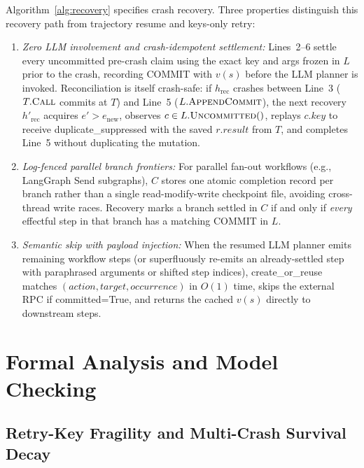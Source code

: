 \documentclass[10pt,journal]{IEEEtran}
\def\texttt#1{#1}%
\theoremstyle{definition}
\theoremstyle{remark}
\begin{document}
Algorithm~\ref{alg:recovery} specifies crash recovery. Three properties distinguish this recovery path from trajectory resume and keys-only retry:
\begin{enumerate}
  \item \emph{Zero LLM involvement and crash-idempotent settlement:} Lines~2--6 settle every uncommitted pre-crash claim using the exact \texttt{key} and \texttt{args} frozen in $L$ prior to the crash, recording \texttt{COMMIT} with $v(s)$ before the LLM planner is invoked. Reconciliation is itself crash-safe: if $h_{\mathrm{rec}}$ crashes between Line~3 ($T.\textsc{Call}$ commits at $T$) and Line~5 ($L.\textsc{AppendCommit}$), the next recovery $h'_{\mathrm{rec}}$ acquires $e' > e_{\mathrm{new}}$, observes $c \in L.\textsc{Uncommitted}()$, replays $c.\mathit{key}$ to receive \texttt{duplicate\_suppressed} with the saved $r.\mathit{result}$ from $T$, and completes Line~5 without duplicating the mutation.
  \item \emph{Log-fenced parallel branch frontiers:} For parallel fan-out workflows (e.g., \texttt{LangGraph} \texttt{Send} subgraphs), $C$ stores one atomic completion record per branch rather than a single read-modify-write checkpoint file, avoiding cross-thread write races. Recovery marks a branch settled in $C$ if and only if \emph{every} effectful step in that branch has a matching \texttt{COMMIT} in $L$.
  \item \emph{Semantic skip with payload injection:} When the resumed LLM planner emits remaining workflow steps (or superfluously re-emits an already-settled step with paraphrased arguments or shifted step indices), \texttt{create\_or\_reuse} matches $(\mathit{action}, \mathit{target}, \mathit{occurrence})$ in $O(1)$ time, skips the external RPC if \texttt{committed=True}, and returns the cached $v(s)$ directly to downstream steps.
\end{enumerate}

\section{Formal Analysis and Model Checking}\label{sec:theory}

\subsection{Retry-Key Fragility and Multi-Crash Survival Decay}
\end{document}
